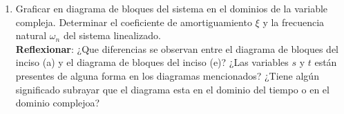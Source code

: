 \documentclass[12pt,a4paper]{report}
\begin{document}
\begin{enumerate}[label=\alph*)]
  \item Graficar en diagrama de bloques del sistema en el dominios de la variable compleja.  Determinar el coeficiente
    de amortiguamiento $\xi$ y la frecuencia natural $\omega_n$ del sistema linealizado.\\
    \textbf{Reflexionar}: ¿Que diferencias se observan entre el diagrama de bloques del inciso (a) y el diagrama de
    bloques del inciso (e)? ¿Las variables $s$ y $t$ están presentes de alguna forma en los diagramas mencionados? ¿Tiene
    algún significado subrayar que el diagrama esta en el dominio del tiempo o en el dominio complejoa?

  \end{enumerate}
\end{document}
